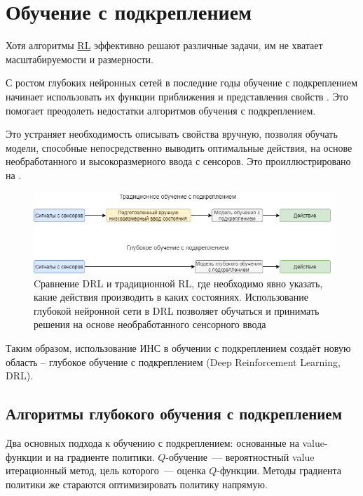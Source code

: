 \section{Обучение с подкреплением} \label{ch1:rl}

Хотя алгоритмы \hyperref[acr:rl]{RL} эффективно решают различные задачи, им не хватает масштабируемости и размерности.

С ростом глубоких нейронных сетей в последние годы обучение с подкреплением начинает использовать их функции приближения и представления свойств \cite{HORNIK1991251}. Это помогает преодолеть недостатки алгоритмов обучения с подкреплением.

Это устраняет необходимость описывать свойства вручную, позволяя обучать модели, способные непосредственно выводить оптимальные действия, на основе необработанного и высокоразмерного ввода с сенсоров. Это проиллюстрировано на .

\begin{figure}[ht!]
    \center
    \includegraphics [scale=0.65] {my_folder/images/ch1/DRL-flow.png}
    \caption{Cравнение DRL и традиционной RL, где необходимо явно указать, какие действия производить в каких состояниях. Использование глубокой нейронной сети в DRL позволяет обучаться и принимать решения на основе необработанного сенсорного ввода}
    \label{fig:DRL-flow}
\end{figure}

Таким образом, использование ИНС в обучении с подкреплением создаёт новую область – глубокое обучение с подкреплением (Deep Reinforcement Learning, DRL).

\subsection{Алгоритмы глубокого обучения с подкреплением}

Два основных подхода к обучению с подкреплением: основанные на value-функции и на градиенте политики. $Q$-обучение~--- вероятностный value итерационный метод, цель которого~--- оценка $Q$-функции. Методы градиента политики же стараются оптимизировать политику напрямую.

